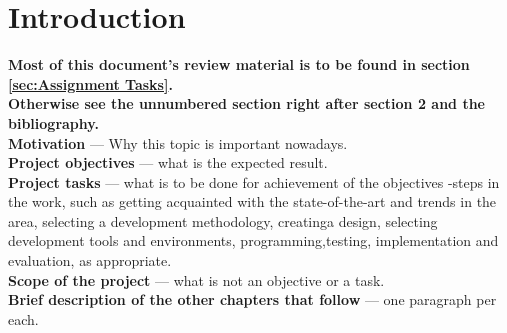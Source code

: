\section{Introduction}
\label{sec:introduction} %
    \textbf{Most of this document's review material is to be found in section \ref{sec:Assignment Tasks}.
    \\    
    Otherwise see the unnumbered section right after section 2 and the bibliography.}\\ 
    \textbf{Motivation} — Why this topic is important nowadays.\\
    \textbf{Project objectives} — what is the expected result.\\
    \textbf{Project tasks} — what is to be done for achievement of the objectives -steps  in  the  work, 
        such  as  getting  acquainted  with  the  state-of-the-art and  trends  in  the  area,  
        selecting  a  development  methodology,  creatinga  design,  selecting  development  tools  and  environments,  
        programming,testing, implementation and evaluation, as appropriate.\\
    \textbf{Scope of the project} — what is not an objective or a task.\\
    \textbf{Brief description of the other chapters that follow} — one paragraph per each.
\clearpage